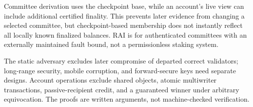 Committee derivation uses the checkpoint base, while an account's live view can include additional certified finality. This prevents later evidence from changing a selected committee, but checkpoint-based membership does not instantly reflect all locally known finalized balances. RAI is for authenticated committees with an externally maintained fault bound, not a permissionless staking system.

The static adversary excludes later compromise of departed correct validators; long-range security, mobile corruption, and forward-secure keys need separate designs. Account operations exclude shared objects, atomic multiwriter transactions, passive-recipient credit, and a guaranteed winner under arbitrary equivocation. The proofs are written arguments, not machine-checked verification.
